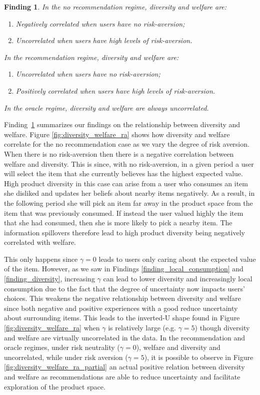 \documentclass[format=acmsmall, review=false]{acmart}
\newtheorem{finding}{Finding}
\begin{document}
\begin{finding}\label{finding_diversity_welfare_corr}
In the no recommendation regime, diversity and welfare are:
\begin{enumerate}
\item Negatively correlated when users have no risk-aversion;
\item Uncorrelated when users have high levels of risk-aversion.
\end{enumerate}
In the recommendation regime, diversity and welfare are:
\begin{enumerate}
\item Uncorrelated when users have no risk-aversion;
\item Positively correlated when users have high levels of risk-aversion.
\end{enumerate}
In the oracle regime, diversity and welfare are always uncorrelated.
\end{finding}

Finding~\ref{finding_diversity_welfare_corr} summarizes our findings on the relationship between diversity and welfare. Figure \ref{fig:diversity_welfare_ra} shows how diversity and welfare correlate for the no recommendation case as we vary the degree of risk aversion. When there is no risk-aversion then there is a negative correlation between welfare and diversity. This is since, with no risk-aversion, in a given period a user will select the item that she currently believes has the highest expected value. High product diversity in this case can arise from a user who consumes an item she disliked and updates her beliefs about nearby items negatively. As a result, in the following period she will pick an item far away in the product space from the item that was previously consumed. If instead the user valued highly the item that she had consumed, then she is more likely to pick a nearby item. The information spillovers therefore lead to high product diversity being negatively correlated with welfare.
\par
This only happens since $\gamma = 0$ leads to users only caring about the expected value of the item. However, as we saw in Findings \ref{finding_local_consumption} and \ref{finding_diversity}, increasing $\gamma$ can lead to lower diversity and increasingly local consumption due to the fact that the degree of uncertainty now impacts users' choices. This weakens the negative relationship between diversity and welfare since both negative and positive experiences with a good reduce uncertainty about surrounding items. This leads to the inverted-U shape found in Figure \ref{fig:diversity_welfare_ra} when $\gamma$ is relatively large (e.g. $\gamma = 5$) though diversity and welfare are virtually uncorrelated in the data. In the recommendation and oracle regimes, under risk neutrality ($\gamma=0$), welfare and diversity and uncorrelated, while under risk aversion ($\gamma=5$), it is possible to observe in Figure \ref{fig:diversity_welfare_ra_partial} an actual positive relation between diversity and welfare as recommendations are able to reduce uncertainty and facilitate exploration of the product space.
\end{document}
